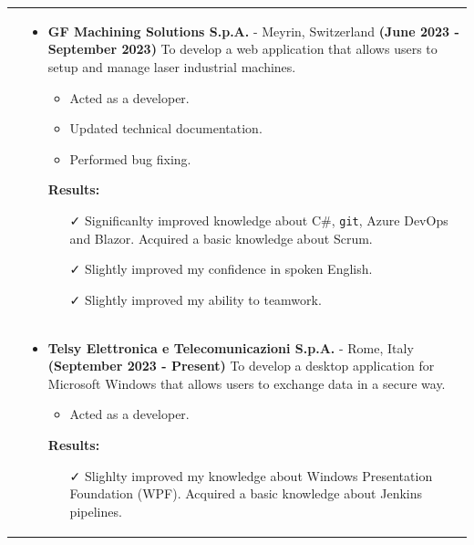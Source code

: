 \documentclass[english,10pt,a4paper]{article}
\newcommand{\CvCheck}{\textcolor{CvColor}{\faCheck}}
\def\SidebarHSize{3.95cm}
\def\BodyHSize{12.5cm}
\begin{document}
\begin{tabular}{p{\SidebarHSize}|p{\BodyHSize}}

& \begin{itemize}
	\item \textbf{GF Machining Solutions S.p.A.} - Meyrin, Switzerland \newline
	\textbf{(June 2023 - September 2023)} \newline
	To develop a web application that allows users to setup and manage laser industrial machines.
	
	\begin{itemize}
		\item Acted as a developer.
		\item Updated technical documentation.
		\item Performed bug fixing.
	\end{itemize}
	
	\textcolor{CvColor}{\textbf{Results:}}
	\begin{itemize}
		\item[\CvCheck] Significanlty improved knowledge about C\#, \texttt{git}, Azure DevOps and Blazor. Acquired a basic knowledge about Scrum. 
		\item[\CvCheck] Slightly improved my confidence in spoken English.
		\item[\CvCheck] Slightly improved my ability to teamwork.
	\end{itemize}
\end{itemize} \\

& \begin{itemize}
	\item \textbf{Telsy Elettronica e Telecomunicazioni S.p.A.} - Rome, Italy \newline
	\textbf{(September 2023 - Present)} \newline
	To develop a desktop application for Microsoft Windows that allows users to exchange data in a secure way.
		
	\begin{itemize}
		\item Acted as a developer.
	\end{itemize}
	
	\textcolor{CvColor}{\textbf{Results:}}
	\begin{itemize}
		\item[\CvCheck] Slighlty improved my knowledge about Windows Presentation Foundation (WPF). Acquired a basic knowledge about Jenkins pipelines.
	\end{itemize}
\end{itemize}

\end{tabular}
\end{document}
